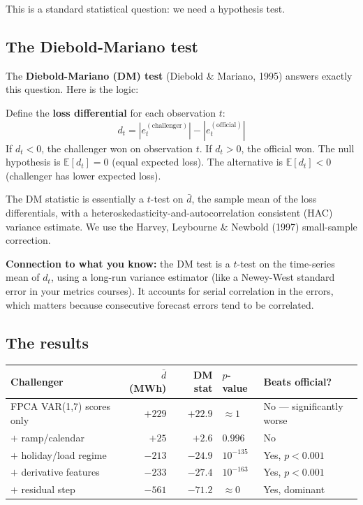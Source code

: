 \documentclass[11pt,a4paper]{article}
\begin{document}
This is a standard statistical question: we need a hypothesis test.

\subsection{The Diebold-Mariano test}

The \textbf{Diebold-Mariano (DM) test} (Diebold \& Mariano, 1995)
answers exactly this question. Here is the logic:

Define the \textbf{loss differential} for each observation $t$:
\[
d_t = |e_t^{(\text{challenger})}| - |e_t^{(\text{official})}|
\]
If $d_t < 0$, the challenger won on observation $t$. If $d_t > 0$, the
official won. The null hypothesis is $\mathbb{E}[d_t] = 0$ (equal
expected loss). The alternative is $\mathbb{E}[d_t] < 0$ (challenger
has lower expected loss).

The DM statistic is essentially a $t$-test on $\bar{d}$, the sample
mean of the loss differentials, with a heteroskedasticity-and-autocorrelation
consistent (HAC) variance estimate. We use the Harvey, Leybourne \&
Newbold (1997) small-sample correction.

\begin{keybox}
\textbf{Connection to what you know:} the DM test is a $t$-test on
the time-series mean of $d_t$, using a long-run variance estimator
(like a Newey-West standard error in your metrics courses). It
accounts for serial correlation in the errors, which matters because
consecutive forecast errors tend to be correlated.
\end{keybox}

\subsection{The results}

\begin{center}
\begin{tabular}{lrrll}
\toprule
Challenger & $\bar{d}$ (MWh) & DM stat & $p$-value & Beats official? \\
\midrule
FPCA VAR(1,7) scores only & $+229$ & $+22.9$ & $\approx 1$ & No --- significantly worse \\
$+$ ramp/calendar         & $+25$  & $+2.6$  & $0.996$    & No \\
$+$ holiday/load regime   & $-213$ & $-24.9$ & $10^{-135}$ & Yes, $p < 0.001$ \\
$+$ derivative features   & $-233$ & $-27.4$ & $10^{-163}$ & Yes, $p < 0.001$ \\
$+$ residual step         & $-561$ & $-71.2$ & $\approx 0$ & Yes, dominant \\
\bottomrule
\end{tabular}
\end{center}
\end{document}
